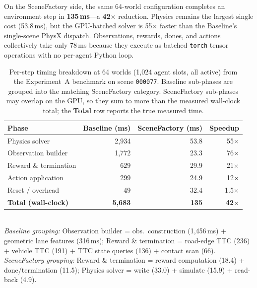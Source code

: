 On the SceneFactory side, the same 64-world configuration completes an environment step in \textbf{135\,ms}---a \textbf{42$\times$} reduction.
Physics remains the largest single cost (53.8\,ms), but the GPU-batched solver is 55$\times$ faster than the Baseline's single-scene PhysX dispatch.
Observations, rewards, dones, and actions collectively take only 78\,ms because they execute as batched \texttt{torch} tensor operations with no per-agent Python loop.

\begin{table}[t]
\centering
\caption{Per-step timing breakdown at 64 worlds (1{,}024 agent slots, all active) from the Experiment~A benchmark on scene \texttt{000077}.
Baseline sub-phases are grouped into the matching SceneFactory category.
SceneFactory sub-phases may overlap on the GPU, so they sum to more than the measured wall-clock total; the \textbf{Total} row reports the true measured time.}
\label{tab:app_timing_breakdown}
\small
\begin{tabular}{lrrr}
\toprule
Phase & Baseline (ms) & SceneFactory (ms) & Speedup \\
\midrule
Physics solver         & 2{,}934 &  53.8 & 55$\times$ \\
Observation builder    & 1{,}772 &  23.3 & 76$\times$ \\
Reward \& termination  &     629 &  29.9 & 21$\times$ \\
Action application     &     299 &  24.9 & 12$\times$ \\
Reset / overhead       &      49 &  32.4 &  1.5$\times$ \\
\midrule
\textbf{Total (wall-clock)} & \textbf{5{,}683} & \textbf{135} & \textbf{42$\times$} \\
\bottomrule
\end{tabular}
\\[4pt]
{\footnotesize
\emph{Baseline grouping:}
Observation builder = obs.\ construction (1{,}456\,ms) + geometric lane features (316\,ms);
Reward \& termination = road-edge TTC (236) + vehicle TTC (191) + TTC state queries (136) + contact scan (66).
\emph{SceneFactory grouping:}
Reward \& termination = reward computation (18.4) + done/termination (11.5);
Physics solver = write (33.0) + simulate (15.9) + read-back (4.9).}
\end{table}

